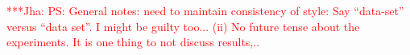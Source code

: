 \documentclass[a4paper,11pt]{article}
\newcommand{\jhanote}[1]{ {\textcolor{red} { ***Jha: #1 }}}
\newcommand{\jhanote}[1]{}
\begin{document}
\jhanote{PS: General notes: need to maintain consistency of style: Say ``data-set'' versus ``data set''. I might be guilty too...  (ii) No future tense about the
experiments. It is one thing to not discuss results,.. }


 

\end{document}

